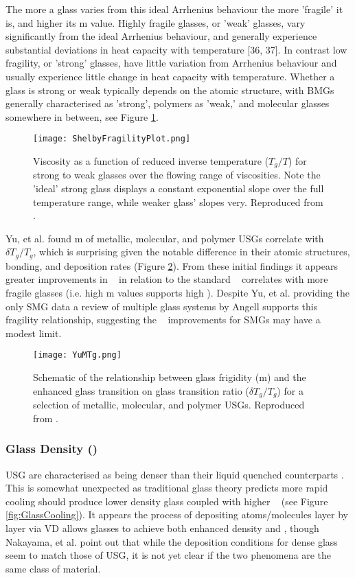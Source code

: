 \documentclass[a4paper,12pt,oneside]{report}%
\begin{document}
The more a glass varies from this ideal Arrhenius behaviour the more 'fragile' it is, and higher its m value. Highly fragile glasses, or 'weak' glasses, vary significantly from the ideal Arrhenius behaviour, and generally experience substantial deviations in heat capacity with temperature [36, 37]. In contrast low fragility, or 'strong' glasses, have little variation from Arrhenius behaviour and usually experience little change in heat capacity with temperature. Whether a glass is strong or weak typically depends on the atomic structure, with BMGs generally characterised as 'strong', polymers as 'weak,' and molecular glasses somewhere in between, see Figure \ref{fig:ShelbyFragPlot}. 

\begin{figure}[htbp]
	\centering
	\texttt{[image: ShelbyFragilityPlot.png]}
	\caption{Viscosity as a function of reduced inverse temperature ($T_{g}/T$) for strong to weak glasses over the flowing range of viscosities. Note the 'ideal' strong glass displays a constant exponential slope over the full temperature range, while weaker glass' slopes very. Reproduced from \cite{Shelby2005}.}
	\label{fig:ShelbyFragPlot}
\end{figure}

Yu, et al. \cite{Yu2013} found m of metallic, molecular, and polymer USGs correlate with $\delta T_{g}/T_{g}$, which is surprising given the notable difference in their atomic structures, bonding, and deposition rates (Figure \ref{fig:YuMTgPlot}). From these initial findings it appears greater improvements in \dTg~ in relation to the standard \Tg~ correlates with more fragile glasses (i.e. high m values supports high \dTg). Despite  Yu, et al. \cite{Yu2013} providing the only SMG data a review of multiple glass systems by Angell \cite{Angell2014} supports this fragility relationship,  suggesting the  \dTg~ improvements for SMGs may have a modest limit. 

\begin{figure}[htbp]
	\centering
	\texttt{[image: YuMTg.png]}
	\caption{Schematic of the relationship between glass frigidity (m) and the enhanced glass transition on glass transition ratio ($\delta T_{g}/T_{g}$) for a selection of metallic, molecular, and polymer USGs. Reproduced from \cite{Yu2013}.}
	\label{fig:YuMTgPlot}
\end{figure}

\subsubsection{Glass Density (\p)} 
USG are characterised as being denser than their liquid quenched counterparts \cite{Wang2014}. This is somewhat unexpected as traditional glass theory predicts more rapid cooling should produce lower density glass coupled with higher \Tg~ (see Figure \ref{fig:GlassCooling}). It appears the process of depositing atoms/molecules layer by layer via VD allows glasses to achieve both enhanced density and \Tg, though Nakayama, et al. \cite{Nakayama2013} point out that while the deposition conditions for dense glass seem to match those of USG, it is not yet clear if the two phenomena are the same class of material.
\end{document}
